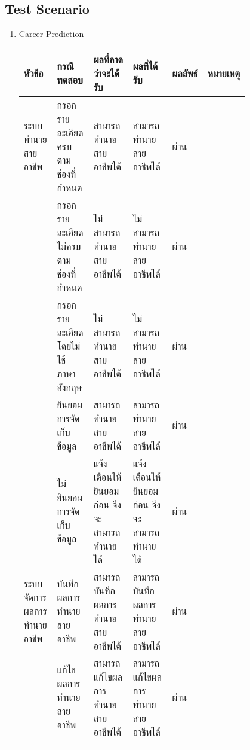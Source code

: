 \subsection{Test Scenario}
\begin{enumerate}
    \item Career Prediction
          \begin{longtable}{|>{\raggedright\arraybackslash}p{0.1\linewidth}|>{\raggedright\arraybackslash}p{0.15\linewidth}|>{\raggedright\arraybackslash}p{0.17\linewidth}|>{\raggedright\arraybackslash}p{0.17\linewidth}|>{\centering}p{0.1\linewidth}|>{\raggedright\arraybackslash}p{0.1\linewidth}|} \hline
              หัวข้อ                   & กรณีทดสอบ                              & ผลที่คาดว่าจะได้รับ                              & ผลที่ได้รับ                                     & ผลลัพธ์ & หมายเหตุ \\ \hline
              \endhead
              ระบบทำนายสายอาชีพ        & กรอกรายละเอียดครบตามช่องที่กำหนด           & สามารถทำนายสายอาชีพได้                         & สามารถทำนายสายอาชีพได้                         & ผ่าน   &         \\ \cline{2-6}
                                     & กรอกรายละเอียดไม่ครบตามช่องที่กำหนด         & ไม่สามารถทำนายสายอาชีพได้                       & ไม่สามารถทำนายสายอาชีพได้                       & ผ่าน   &         \\ \cline{2-6}
                                     & กรอกรายละเอียดโดยไม่ใช้ภาษาอังกฤษ         & ไม่สามารถทำนายสายอาชีพได้                       & ไม่สามารถทำนายสายอาชีพได้                       & ผ่าน   &         \\ \cline{2-6}
                                     & ยินยอมการจัดเก็บข้อมูล                     & สามารถทำนายสายอาชีพได้                         & สามารถทำนายสายอาชีพได้                         & ผ่าน   &         \\ \cline{2-6}
                                     & ไม่ยินยอมการจัดเก็บข้อมูล                   & แจ้งเตือนให้ยินยอมก่อน จึงจะสามารถทำนายได้          & แจ้งเตือนให้ยินยอมก่อน จึงจะสามารถทำนายได้          & ผ่าน   &         \\ \hline
              ระบบจัดการผลการทำนายอาชีพ & บันทึกผลการทำนายสายอาชีพ                  & สามารถบันทึกผลการทำนายสายอาชีพได้                & สามารถบันทึกผลการทำนายสายอาชีพได้                & ผ่าน   &         \\ \cline{2-6}
                                     & แก้ไขผลการทำนายสายอาชีพ                  & สามารถแก้ไขผลการทำนายสายอาชีพได้                & สามารถแก้ไขผลการทำนายสายอาชีพได้                & ผ่าน   &         \\ \cline{2-6}

\end{longtable}
\end{enumerate}
